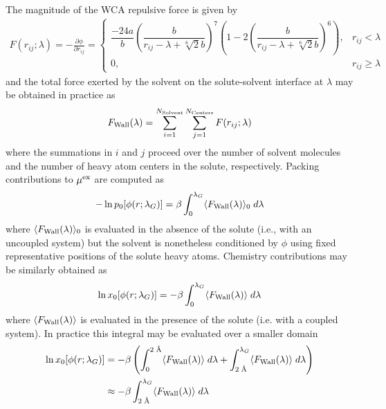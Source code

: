 \documentclass[journal=jacsat,articletitle=true,manuscript=suppinfo,layout=onecolumn]{achemso}
\begin{document}
    The magnitude of the WCA repulsive force is given by
    \begin{eqnarray}
    F(r_{ij} ; \lambda) = -\frac{\partial \phi}{\partial r_{ij}} = 
    \begin{cases}
         \dfrac{-24 a}{b} \left( \dfrac{b}{r_{ij} - \lambda +  \sqrt[6]{2}b} \right)^7 \left(1-2 \left( \dfrac{b}{r_{ij} - \lambda +  \sqrt[6]{2}b} \right)^6 \right), &  r_{ij} < \lambda \\
        0, & r_{ij} \ge \lambda
    \end{cases}
    \label{eq:wca_force}
    \end{eqnarray}
    and the total force exerted by the solvent on the solute-solvent interface at $\lambda$ may be obtained in practice as 
    \begin{eqnarray}
    F_{\rm{Wall}}(\lambda) = \sum_{i=1}^{N_{\rm{Solvent}}} \sum_{j=1}^{N_{\rm{Centers}}} F(r_{ij} ; \lambda)
    \label{eq:fwall}
    \end{eqnarray}
    where the summations in $i$ and $j$ proceed over the number of solvent molecules and the number of heavy atom centers in the solute, respectively. Packing contributions to $\mu^{\rm{ex}}$ are computed as 
    \begin{eqnarray}
    - \ln p_0[\phi(r; \lambda_G)] = \beta \int_{0}^{\lambda_G} \langle F_{\rm{Wall}} (\lambda) \rangle_{0} \; d \lambda
    \label{eq:packing}
    \end{eqnarray}   
    where $\langle F_{\rm{Wall}} (\lambda) \rangle_{0}$ is evaluated in the absence of the solute (i.e., with an uncoupled system) but the solvent is nonetheless conditioned by $\phi$ using fixed representative positions of the solute heavy atoms. Chemistry contributions may be similarly obtained as 
    \begin{eqnarray}
    \ln x_0[\phi(r; \lambda_G)] = -\beta \int_{0}^{\lambda_G} \langle F_{\rm{Wall}} (\lambda) \rangle \; d \lambda
    \label{eq:chemistry}
    \end{eqnarray}   
    where $\langle F_{\rm{Wall}} (\lambda) \rangle$ is evaluated in the presence of the solute (i.e. with a coupled system). In practice this integral may be evaluated over a smaller domain
    \begin{align}
    \ln x_0[\phi(r; \lambda_G)] &= -\beta \left( \int_{0}^{2 \; \text{\AA}} \langle F_{\rm{Wall}} (\lambda) \rangle \; d \lambda + \int_{2 \; \text{\AA}}^{\lambda_G} \langle F_{\rm{Wall}} (\lambda) \rangle \; d \lambda \right) \\
    &\approx -\beta \int_{2 \; \text{\AA}}^{\lambda_G} \langle F_{\rm{Wall}} (\lambda) \rangle \; d \lambda
    \label{eq:chemistry_2A}
    \end{align}
\end{document}
